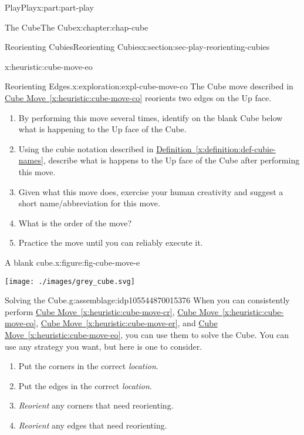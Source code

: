 \documentclass[oneside,10pt,]{book}
\newcommand{\xreffont}{\relax}
\numberwithin{equation}{section}
\begin{document}
\begin{partptx}{Play}{}{Play}{}{}{x:part:part-play}
\begin{chapterptx}{The Cube}{}{The Cube}{}{}{x:chapter:chap-cube}
\begin{sectionptx}{Reorienting Cubies}{}{Reorienting Cubies}{}{}{x:section:sec-play-reorienting-cubies}
\begin{heuristic}{}{}{x:heuristic:cube-move-eo}
\end{heuristic}
\begin{exploration}{Reorienting Edges.}{x:exploration:expl-cube-move-co}%
The Cube move described in \hyperref[x:heuristic:cube-move-co]{Cube Move~{\xreffont\ref{x:heuristic:cube-move-co}}} reorients two edges on the Up face.%
%
\begin{enumerate}
\item{}By performing this move several times, identify on the blank Cube below what is happening to the Up face of the Cube.%
\item{}Using the cubie notation described in \hyperref[x:definition:def-cubie-names]{Definition~{\xreffont\ref{x:definition:def-cubie-names}}}, describe what is happens to the Up face of the Cube after performing this move.%
\item{}Given what this move does, exercise your human creativity and suggest a short name\slash{}abbreviation for this move.%
\item{}What is the order of the move?%
\item{}Practice the move until you can reliably execute it.%
\end{enumerate}
\begin{figureptx}{A blank cube.}{x:figure:fig-cube-move-e}{}%
\begin{image}{0.25}{0.5}{0.25}%
\texttt{[image: ./images/grey\_cube.svg]}
\end{image}%
\tcblower
\end{figureptx}%
\end{exploration}%
\begin{assemblage}{Solving the Cube.}{g:assemblage:idp105544870015376}%
When you can consistently perform \hyperref[x:heuristic:cube-move-cr]{Cube Move~{\xreffont\ref{x:heuristic:cube-move-cr}}}, \hyperref[x:heuristic:cube-move-co]{Cube Move~{\xreffont\ref{x:heuristic:cube-move-co}}}, \hyperref[x:heuristic:cube-move-er]{Cube Move~{\xreffont\ref{x:heuristic:cube-move-er}}}, and \hyperref[x:heuristic:cube-move-eo]{Cube Move~{\xreffont\ref{x:heuristic:cube-move-eo}}}, you can use them to solve the Cube. You can use any strategy you want, but here is one to consider.%
\begin{enumerate}
\item{}Put the corners in the correct \emph{location}.%
\item{}Put the edges in the correct \emph{location}.%
\item{}\emph{Reorient} any corners that need reorienting.%
\item{}\emph{Reorient} any edges that need reorienting.%

\end{enumerate}
\end{assemblage}
\end{sectionptx}
\end{chapterptx}
\end{partptx}
\end{document}
